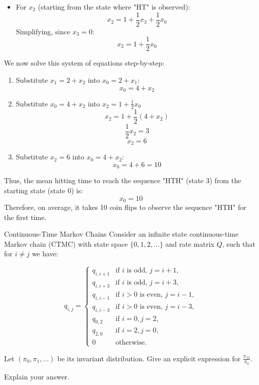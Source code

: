 \begin{solution}
\begin{itemize}
    \item For $x_2$ (starting from the state where "HT" is observed):
      \[
        x_2 = 1 + \frac{1}{2}x_3 + \frac{1}{2}x_0
      \]
      Simplifying, since \( x_3 = 0 \):
      \[
        x_2 = 1 + \frac{1}{2}x_0
      \]
  \end{itemize}

  We now solve this system of equations step-by-step:

  \begin{enumerate}
    \item Substitute \( x_1 = 2 + x_2 \) into \( x_0 = 2 + x_1 \):
      \[
        x_0 = 4 + x_2
      \]
    \item Substitute \( x_0 = 4 + x_2 \) into \( x_2 = 1 + \frac{1}{2}x_0 \)
      \[
        x_2 = 1 + \frac{1}{2}\left( 4 + x_2 \right)
      \]
      \[
        \frac{1}{2}x_2 = 3
      \]
      \[
        x_2 = 6
      \]
    \item Substitute \( x_2 = 6 \) into \( x_0 = 4 + x_2 \):
      \[
        x_0 = 4 + 6 = 10
      \]
  \end{enumerate}

  Thus, the mean hitting time to reach the sequence "HTH" (state 3) from the starting state (state 0) is:
  \[
  \boxed{x_0 = 10}
  \]
  Therefore, on average, it takes 10 coin flips to observe the sequence "HTH" for the first time.
\end{solution}

\begin{problem}{Continuous-Time Markov Chains}
Consider an infinite state continuous-time Markov chain (CTMC) with state space $\{0, 1, 2, \ldots\}$ and rate matrix $Q$, such that for $i \neq j$ we have:

\[
q_{i,j} =
\begin{cases}
    q_{i,i+1} & \text{if } i \text{ is odd, } j = i + 1, \\
    q_{i,i+3} & \text{if } i \text{ is odd, } j = i + 3, \\
    q_{i,i-1} & \text{if } i > 0 \text{ is even, } j = i - 1, \\
    q_{i,i-3} & \text{if } i > 0 \text{ is even, } j = i - 3, \\
    q_{0,2} & \text{if } i = 0, j = 2, \\
    q_{2,0} & \text{if } i = 2, j = 0, \\
    0 & \text{otherwise.}
\end{cases}
\]

Let $(\pi_0, \pi_1, \ldots)$ be its invariant distribution. Give an explicit expression for $\frac{\pi_{13}}{\pi_0}$.

Explain your answer.
\end{problem}

